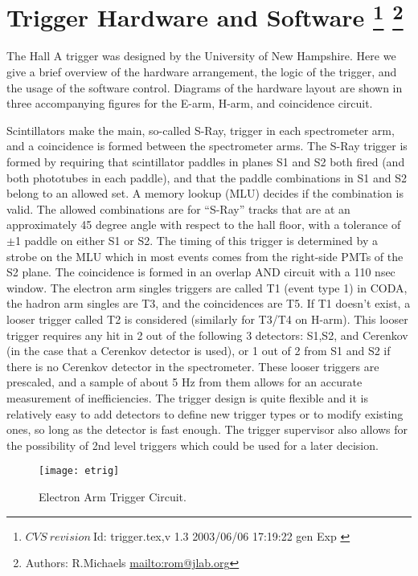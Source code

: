\section[Trigger Hardware and Software]{Trigger Hardware and Software
\footnote{
  $CVS~revision~ $Id: trigger.tex,v 1.3 2003/06/06 17:19:22 gen Exp $ $
}
\footnote{Authors: R.Michaels \url{mailto:rom@jlab.org}}
}

\par
The Hall A trigger was designed by the
University of New Hampshire.
Here we give a brief overview of the 
hardware arrangement,
the logic of the trigger, and the usage
of the software control.
Diagrams of the hardware layout are shown in
three accompanying 
figures for the E-arm, H-arm,
and coincidence circuit.

\par
Scintillators make the main, so-called S-Ray,
trigger in each spectrometer arm, and a
coincidence is formed between the spectrometer
arms.  The S-Ray trigger is formed by
requiring that scintillator paddles in
planes S1 and S2 both fired (and both phototubes
in each paddle), and that the paddle
combinations in S1 and S2 belong to an
allowed set.  A memory lookup (MLU) decides
if the combination is valid.  The allowed
combinations are for ``S-Ray'' tracks that are at
an approximately 45 degree angle with respect
to the hall floor, with a tolerance of $\pm$1
paddle on either S1 or S2.  The timing of
this trigger is determined by a strobe on
the MLU which in most events comes from the 
right-side PMTs of the S2 plane.  The coincidence
is formed in an overlap AND circuit with
a 110 nsec window.  The electron arm singles
triggers are called T1 (event type 1) in CODA,
the hadron arm singles are T3, and the coincidences
are T5.  If T1 doesn't exist, a looser trigger
called T2 is considered (similarly for T3/T4 on
H-arm).  This looser trigger requires any hit
in 2 out of the following 3 detectors: 
S1,S2, and Cerenkov
(in the case that a Cerenkov detector is used), 
or 1 out of 2 from S1 and S2 if there is no
Cerenkov detector in the spectrometer.  
These looser triggers are prescaled,
and a sample of about 5 Hz from them allows for
an accurate measurement of inefficiencies.
The trigger design is quite flexible and it
is relatively easy to add detectors to define
new trigger types or to modify existing ones,
so long as the detector is fast enough.
The trigger supervisor also allows for the
possibility of 2nd level triggers which could
be used for a later decision.

\begin{figure}
\begin{center}
\texttt{[image: etrig]}
{\linespread{1.}
\caption[Data Acquisition: Electron Arm Trigger]{Electron Arm Trigger Circuit.}
\label{fig:etrig}}
\end{center}
\end{figure}

